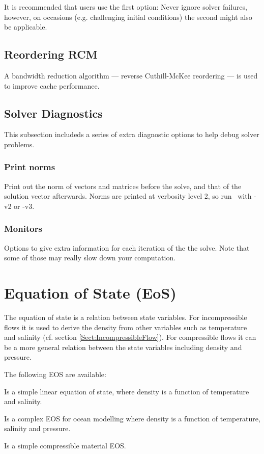It is recommended that users use the first option: Never ignore solver failures, however, on occasions (e.g. challenging initial conditions) the second might also be applicable. 

\subsection{Reordering RCM}

A bandwidth reduction algorithm --- reverse Cuthill-McKee reordering --- is used to improve cache performance.

\subsection{Solver Diagnostics}

This subsection includeds a series of extra diagnostic options to help debug solver problems. 

\subsubsection{Print norms}
Print out the norm of vectors and matrices before the solve, and that of the solution vector afterwards. Norms are printed at verbosity level 2, so run \fluidity\ with -v2 or -v3.

\subsubsection{Monitors}
Options to give extra information for each iteration of the the solve. Note that some of those may really slow down your computation. 


\section{Equation of State (EoS)}\label{Sect:ConfigEOS}

The equation of state is a relation between state 
variables. For incompressible flows it is used to derive the density
from other variables such as temperature and salinity (cf. section \ref{Sect:IncompressibleFlow}). For compressible
flows it can be a more general relation between the state variables
including density and pressure.

The following EOS are available:

\begin{description}
\item{} 
Is a simple linear equation of state,
where density is a function of temperature and salinity.

\item{} Is a complex EOS for ocean modelling where density is a function of temperature, salinity and pressure.
\item{} Is a simple compressible material EOS.
\end{description}

